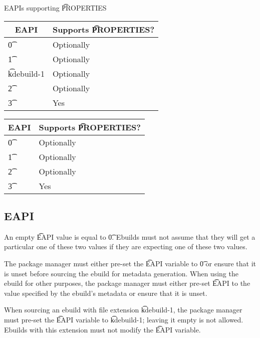 \begin{centertable}{EAPIs supporting \t{PROPERTIES}} \label{tab:properties-table}
\IFKDEBUILDELSE
{
    \begin{tabular}{ l l }
        \toprule
        \multicolumn{1}{c}{\textbf{EAPI}} &
        \multicolumn{1}{c}{\textbf{Supports \t{PROPERTIES}?}} \\
        \midrule
    \t{0} & Optionally \\
    \t{1} & Optionally \\
    \t{kdebuild-1} & Optionally \\
    \t{2} & Optionally \\
    \t{3} & Yes \\
    \bottomrule
    \end{tabular}
}
{
    \begin{tabular}{ l l }
        \toprule
        \multicolumn{1}{c}{\textbf{EAPI}} &
        \multicolumn{1}{c}{\textbf{Supports \t{PROPERTIES}?}} \\
        \midrule
    \t{0} & Optionally \\
    \t{1} & Optionally \\
    \t{2} & Optionally \\
    \t{3} & Yes \\
    \bottomrule
    \end{tabular}
}
\end{centertable}

\subsection{EAPI}
\label{sec:pre-source-eapi}

An empty \t{EAPI} value is equal to \t{0}. Ebuilds must not assume that they will get a particular
one of these two values if they are expecting one of these two values.

The package manager must either pre-set the \t{EAPI} variable to \t{0} or ensure that it is unset
before sourcing the ebuild for metadata generation. When using the ebuild for other purposes, the
package manager must either pre-set \t{EAPI} to the value specified by the ebuild's metadata or
ensure that it is unset.

\IFKDEBUILDELSE
{
    When sourcing an ebuild with file extension \t{kdebuild-1}, the package manager must pre-set the
    \t{EAPI} variable to \t{kdebuild-1}; leaving it empty is not allowed. Ebuilds with this
    extension must not modify the \t{EAPI} variable.
}{
}

